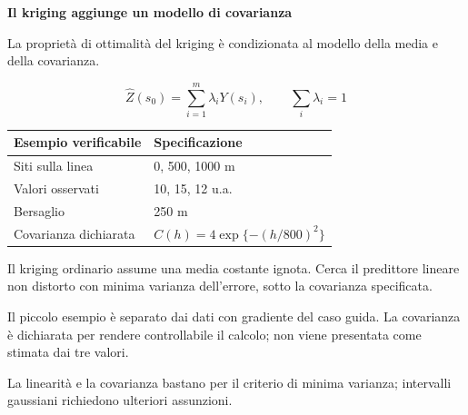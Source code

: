 \documentclass[12pt,aspectratio=1610]{beamer}
\newcommand{\PBody}[1]{\par{\fontsize{11.3}{14.8}\selectfont #1\par}}
\newcommand{\PSmall}[1]{\par{\fontsize{9.8}{13.1}\selectfont #1\par}}
\newcommand{\PInfo}[1]{%
\begin{tcolorbox}[enhanced,arc=1.6mm,boxrule=.55pt,colback=GeoTint,
 colframe=Rule!80!Classical,left=2.3mm,right=2.3mm,top=2mm,bottom=2mm,
 before skip=1mm,after skip=1mm]
\PSmall{#1}\end{tcolorbox}}
\begin{document}
\begin{frame}[plain]\hypertarget{slide100}{}
\begin{lrbox}{\TitleBox}
\begin{minipage}[t]{17.7cm}\raggedright\color{Ink}\fontsize{11.3}{14.8}\selectfont
\color{Navy}\bfseries\fontsize{20.6}{24.5}\selectfont Il kriging aggiunge un modello di covarianza
\end{minipage}\end{lrbox}

\begin{lrbox}{\RecallBox}
\begin{minipage}[t]{14.3cm}\raggedright\color{Ink}\fontsize{11.3}{14.8}\selectfont
\fontsize{10.3}{13.8}\selectfont La proprietà di ottimalità del kriging è condizionata al modello della media e della covarianza.
\end{minipage}\end{lrbox}

\begin{lrbox}{\PilotLeftBox}
\begin{minipage}[t]{10.05cm}\raggedright\color{Ink}\fontsize{11.3}{14.8}\selectfont
\[\widehat Z(s_0)=\sum_{i=1}^{m}\lambda_iY(s_i),\qquad \sum_i\lambda_i=1\]
{\fontsize{10.2}{13.1}\selectfont\renewcommand{\arraystretch}{1.45}\begin{tabular}{@{}p{4.0cm}p{5.0cm}@{}}\toprule
\textbf{Esempio verificabile} & \textbf{Specificazione}\\\midrule
Siti sulla linea & 0, 500, 1000 m\\
Valori osservati & 10, 15, 12 u.a.\\
Bersaglio & 250 m\\
Covarianza dichiarata & $C(h)=4\exp\{-(h/800)^2\}$\\
\bottomrule\end{tabular}}

\end{minipage}\end{lrbox}

\begin{lrbox}{\PilotRightBox}
\begin{minipage}[t]{7.55cm}\raggedright\color{Ink}\fontsize{11.3}{14.8}\selectfont
\PBody{Il kriging ordinario assume una media costante ignota. Cerca il predittore lineare non distorto con minima varianza dell’errore, sotto la covarianza specificata.}
\vspace{2.5mm}
\PInfo{Il piccolo esempio è separato dai dati con gradiente del caso guida. La covarianza è dichiarata per rendere controllabile il calcolo; non viene presentata come stimata dai tre valori.}
\PSmall{La linearità e la covarianza bastano per il criterio di minima varianza; intervalli gaussiani richiedono ulteriori assunzioni.}


\end{minipage}
\end{lrbox}
\end{frame}
\end{document}
